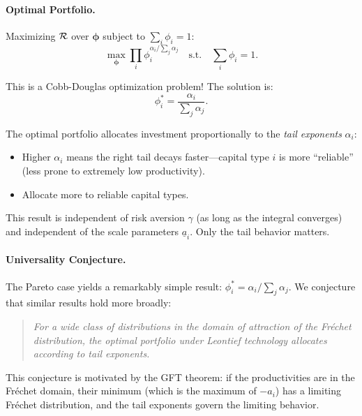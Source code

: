 \paragraph{Optimal Portfolio.}
Maximizing $\mathcal{R}$ over $\boldsymbol{\phi}$ subject to $\sum_i \phi_i = 1$:
\begin{equation}
\max_{\boldsymbol{\phi}} \prod_i \phi_i^{\alpha_i / \sum_j \alpha_j} \quad \text{s.t.} \quad \sum_i \phi_i = 1.
\label{eq:ac-adv-portfolio-pareto}
\end{equation}

This is a Cobb-Douglas optimization problem! The solution is:
\begin{equation}
\boxed{\phi_i^* = \frac{\alpha_i}{\sum_j \alpha_j}.}
\label{eq:ac-adv-phi-pareto}
\end{equation}

\begin{calloutimportant}
The optimal portfolio allocates investment proportionally to the \emph{tail exponents} $\alpha_i$:
\begin{itemize}[nosep]
\item Higher $\alpha_i$ means the right tail decays faster---capital type $i$ is more ``reliable'' (less prone to extremely low productivity).
\item Allocate more to reliable capital types.
\end{itemize}

This result is independent of risk aversion $\gamma$ (as long as the integral converges) and independent of the scale parameters $\underline{a}_i$. Only the tail behavior matters.
\end{calloutimportant}

\paragraph{Universality Conjecture.}
The Pareto case yields a remarkably simple result: $\phi_i^* = \alpha_i / \sum_j \alpha_j$. We conjecture that similar results hold more broadly:

\begin{quote}
\textit{For a wide class of distributions in the domain of attraction of the Fréchet distribution, the optimal portfolio under Leontief technology allocates according to tail exponents.}
\end{quote}

This conjecture is motivated by the GFT theorem: if the productivities are in the Fréchet domain, their minimum (which is the maximum of $-a_i$) has a limiting Fréchet distribution, and the tail exponents govern the limiting behavior.


